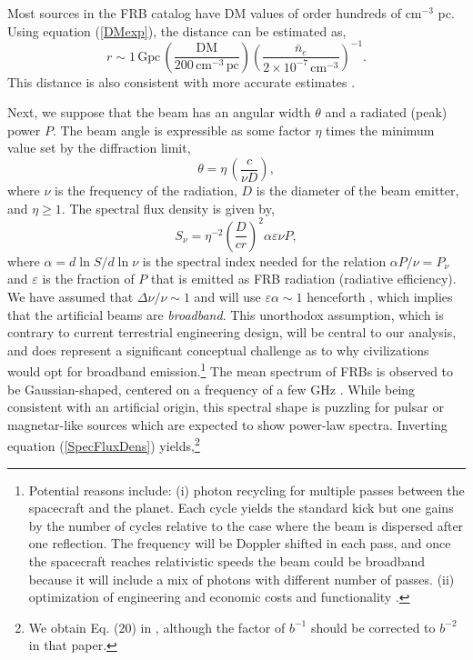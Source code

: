 \documentclass[twocolumn,tighten]{aastex61}
\begin{document}
Most sources in the FRB catalog \citep{Pet16} have DM values of order hundreds of cm$^{-3}$ pc. Using equation (\ref{DMexp}), the distance can be estimated as,
\begin{equation} \label{distFRB}
r \sim 1\,\mathrm{Gpc}\,\left(\frac{\mathrm{DM}}{200\,\mathrm{cm}^{-3}\,\mathrm{pc}}\right) \left(\frac{\bar{n}_e}{2 \times 10^{-7}\,\mathrm{cm}^{-3}}\right)^{-1}.   
\end{equation}
This distance is also consistent with more accurate estimates \citep{Pet15,Pet16}.

Next, we suppose that the beam has an angular width $\theta$ and a radiated (peak) power $P$. The beam angle is expressible as some factor $\eta$ times the minimum value set by the diffraction limit,
\begin{equation} \label{AnguSize}
\theta  = \eta\, \left(\frac{c}{\nu D}\right),
\end{equation}
where $\nu$ is the frequency of the radiation, $D$ is the diameter of the beam emitter, and $\eta \geq 1$. The spectral flux density is given by,
\begin{equation} \label{SpecFluxDens}
S_\nu = \eta^{-2} \left(\frac{D}{c r}\right)^2 \alpha \varepsilon \nu P,
\end{equation}
where $\alpha = d\ln S/d\ln \nu$ is the spectral index needed for the relation $\alpha P/\nu = P_\nu$ and $\varepsilon$ is the fraction of $P$ that is emitted as FRB radiation (radiative efficiency). We have assumed that $\Delta \nu/\nu \sim 1$ and will use $\varepsilon \alpha \sim 1$ henceforth \citep{LuGo16,Katz16}, which implies that the artificial beams are \emph{broadband}. This unorthodox assumption, which is contrary to current terrestrial engineering design, will be central to our analysis, and does represent a significant conceptual challenge as to why civilizations would opt for broadband emission.\footnote{Potential reasons include: (i) photon recycling for multiple passes between the spacecraft and the planet. Each cycle yields the standard kick but one gains by the number of cycles relative to the case where the beam is dispersed after one reflection. The frequency will be Doppler shifted in each pass, and once the spacecraft reaches relativistic speeds the beam could be broadband because it will include a mix of photons with different number of passes. (ii) optimization of engineering and economic costs and functionality \citep{BBB10,Mess12}.} The mean spectrum of FRBs is observed to be Gaussian-shaped, centered on a frequency of a few GHz \citep{Law17}. While being consistent with an artificial origin, this spectral shape is puzzling for pulsar or magnetar-like sources which are expected to show power-law spectra. Inverting equation (\ref{SpecFluxDens}) yields,\footnote{We obtain Eq. (20) in \citet{LuGo16}, although the factor of $b^{-1}$ should be corrected to $b^{-2}$ in that paper.}
\end{document}
